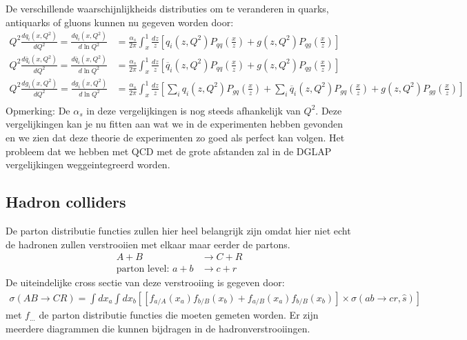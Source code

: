 \documentclass[../main.tex]{subfiles}
\begin{document}
De verschillende waarschijnlijkheids distributies om te veranderen in quarks, antiquarks of gluons kunnen nu gegeven worden door:
\begin{equation}
    \begin{aligned}
        \label{eq:dglap}
        Q^2 \frac{dq_i(x, Q^2)}{dQ^2} = \frac{dq_i(x,Q^2)}{d\ln Q^2} &= \frac{\alpha_s}{2\pi} \int_x^1 \frac{dz}{z} \left[ q_i(z,Q^2)P_{qq}\left( \frac{x}{z} \right) + g(z,Q^2)P_{qg} \left( \frac{x}{z} \right) \right]\\
        Q^2 \frac{d\overline q_i(x, Q^2)}{dQ^2} = \frac{d\overline q_i(x,Q^2)}{d\ln Q^2} &= \frac{\alpha_s}{2\pi} \int_x^1 \frac{dz}{z} \left[ \overline q_i(z,Q^2)P_{qq}\left( \frac{x}{z} \right) + g(z,Q^2)P_{qg} \left( \frac{x}{z} \right) \right]\\
        Q^2 \frac{dg_i(x, Q^2)}{dQ^2} = \frac{dg_i(x,Q^2)}{d\ln Q^2} &= \frac{\alpha_s}{2\pi} \int_x^1 \frac{dz}{z} \left[ \sum_i q_i(z,Q^2)P_{gq}\left( \frac{x}{z} \right) + \sum_i \overline q_i(z,Q^2)P_{gq}\left( \frac{x}{z} \right) + g(z,Q^2)P_{gg} \left( \frac{x}{z} \right) \right]\\
    \end{aligned}
\end{equation}
{\color{green} Opmerking: De $\alpha_s$ in deze vergelijkingen is nog steeds afhankelijk van $Q^2$.}
Deze vergelijkingen kan je nu fitten aan wat we in de experimenten hebben gevonden en we zien dat deze theorie de experimenten zo goed als perfect kan volgen. Het probleem dat we hebben met QCD met de grote afstanden zal in de DGLAP vergelijkingen weggeintegreerd worden.

\subsection{Hadron colliders}%
\label{sub:hadron_colliders}

De parton distributie functies zullen hier heel belangrijk zijn omdat hier niet echt de hadronen zullen verstrooiien met elkaar maar eerder de partons.
\begin{equation}
    \begin{aligned}
        \label{eq:hadr_coll}
        A+B &\rightarrow C + R\\
        \text{parton level: } a+b&\rightarrow c+r
    \end{aligned}
\end{equation}
De uiteindelijke cross sectie van deze verstrooiing is gegeven door:
\begin{equation}
    \begin{aligned}
        \label{eq:hadr_coll_cross_sec}
        \sigma(AB\rightarrow CR) = \int dx_a \int dx_b \left[ \left[ f_{a/A}(x_a) f_{b/B}(x_b) + f_{a/B}(x_a) f_{b/B}(x_b) \right] \times \sigma(ab\rightarrow cr,\hat s)\right]
    \end{aligned}
\end{equation}
met $f_{...}$ de parton distributie functies die moeten gemeten worden. Er zijn meerdere diagrammen die kunnen bijdragen in de hadronverstrooiingen.
\end{document}
